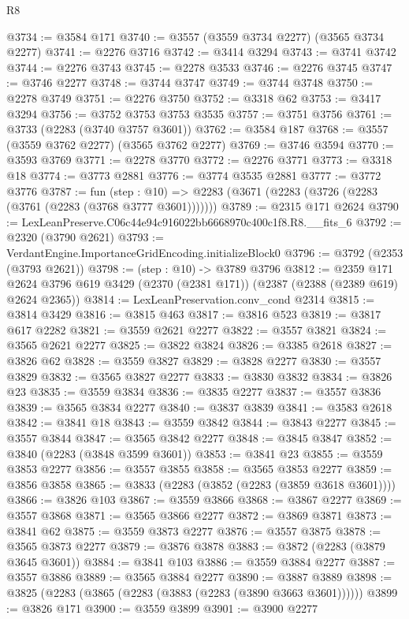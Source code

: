 \begin{lexlean}{R8}
\begin{coremodule}
@3734 := @3584 @171
@3740 := @3557 (@3559 @3734 @2277) (@3565 @3734 @2277)
@3741 := @2276 @3716
@3742 := @3414 @3294
@3743 := @3741 @3742
@3744 := @2276 @3743
@3745 := @2278 @3533
@3746 := @2276 @3745
@3747 := @3746 @2277
@3748 := @3744 @3747
@3749 := @3744 @3748
@3750 := @2278 @3749
@3751 := @2276 @3750
@3752 := @3318 @62
@3753 := @3417 @3294
@3756 := @3752 @3753 @3753 @3535
@3757 := @3751 @3756
@3761 := @3733 (@2283 (@3740 @3757 @3601))
@3762 := @3584 @187
@3768 := @3557 (@3559 @3762 @2277) (@3565 @3762 @2277)
@3769 := @3746 @3594
@3770 := @3593 @3769
@3771 := @2278 @3770
@3772 := @2276 @3771
@3773 := @3318 @18
@3774 := @3773 @2881
@3776 := @3774 @3535 @2881
@3777 := @3772 @3776
@3787 := fun (step : @10) =>
  @2283 (@3671 (@2283 (@3726 (@2283 (@3761 (@2283 (@3768 @3777 @3601)))))))
@3789 := @2315 @171 @2624
@3790 := LexLeanPreserve.C06c44e94c916022bb6668970c400c1f8.R8.__fits_6
@3792 := @2320 (@3790 @2621)
@3793 := VerdantEngine.ImportanceGridEncoding.initializeBlock0
@3796 := @3792 (@2353 (@3793 @2621))
@3798 := (step : @10) -> @3789 @3796
@3812 := @2359
    @171
    @2624
    @3796
    @619
    @3429
    (@2370 (@2381 @171))
    (@2387 (@2388 (@2389 @619) @2624 @2365))
@3814 := LexLeanPreservation.conv_cond @2314
@3815 := @3814 @3429
@3816 := @3815 @463
@3817 := @3816 @523
@3819 := @3817 @617 @2282
@3821 := @3559 @2621 @2277
@3822 := @3557 @3821
@3824 := @3565 @2621 @2277
@3825 := @3822 @3824
@3826 := @3385 @2618
@3827 := @3826 @62
@3828 := @3559 @3827
@3829 := @3828 @2277
@3830 := @3557 @3829
@3832 := @3565 @3827 @2277
@3833 := @3830 @3832
@3834 := @3826 @23
@3835 := @3559 @3834
@3836 := @3835 @2277
@3837 := @3557 @3836
@3839 := @3565 @3834 @2277
@3840 := @3837 @3839
@3841 := @3583 @2618
@3842 := @3841 @18
@3843 := @3559 @3842
@3844 := @3843 @2277
@3845 := @3557 @3844
@3847 := @3565 @3842 @2277
@3848 := @3845 @3847
@3852 := @3840 (@2283 (@3848 @3599 @3601))
@3853 := @3841 @23
@3855 := @3559 @3853 @2277
@3856 := @3557 @3855
@3858 := @3565 @3853 @2277
@3859 := @3856 @3858
@3865 := @3833 (@2283 (@3852 (@2283 (@3859 @3618 @3601))))
@3866 := @3826 @103
@3867 := @3559 @3866
@3868 := @3867 @2277
@3869 := @3557 @3868
@3871 := @3565 @3866 @2277
@3872 := @3869 @3871
@3873 := @3841 @62
@3875 := @3559 @3873 @2277
@3876 := @3557 @3875
@3878 := @3565 @3873 @2277
@3879 := @3876 @3878
@3883 := @3872 (@2283 (@3879 @3645 @3601))
@3884 := @3841 @103
@3886 := @3559 @3884 @2277
@3887 := @3557 @3886
@3889 := @3565 @3884 @2277
@3890 := @3887 @3889
@3898 := @3825 (@2283 (@3865 (@2283 (@3883 (@2283 (@3890 @3663 @3601))))))
@3899 := @3826 @171
@3900 := @3559 @3899
@3901 := @3900 @2277

\end{coremodule}
\end{lexlean}
